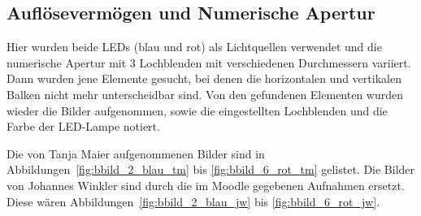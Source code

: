 \documentclass{article}
\begin{document}
\newpage


\subsection{Auflösevermögen und Numerische Apertur}



Hier wurden beide LEDs (blau und rot) als Lichtquellen verwendet und die numerische Apertur mit 3 Lochblenden mit verschiedenen Durchmessern variiert. Dann wurden jene Elemente gesucht, bei denen die horizontalen und vertikalen Balken nicht mehr unterscheidbar sind. Von den gefundenen Elementen wurden wieder die Bilder aufgenommen, sowie die eingestellten Lochblenden und die Farbe der LED-Lampe notiert. 

Die von Tanja Maier aufgenommenen Bilder sind in Abbildungen~\ref{fig:bbild_2_blau_tm} bis \ref{fig:bbild_6_rot_tm} gelistet. Die Bilder von Johannes Winkler sind durch die im Moodle gegebenen Aufnahmen ersetzt. Diese wären Abbildungen~\ref{fig:bbild_2_blau_jw} bis \ref{fig:bbild_6_rot_jw}.

\newpage 
\end{document}
